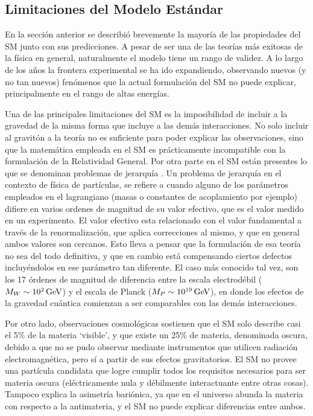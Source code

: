 \subsection{Limitaciones del Modelo Estándar}

En la sección anterior se describió brevemente la mayoría de las propiedades del SM junto con sus predicciones. A pesar de ser una de las teorías más exitosas de la 
física en general,
naturalmente el modelo tiene un rango de validez. A lo largo de los años la frontera experimental se ha ido expandiendo, observando nuevos (y no tan nuevos) fenómenos que la actual formulación del SM no puede explicar, principalmente en el rango de altas energías.

Una de las principales limitaciones del SM es la imposibilidad de incluir a la gravedad de la misma forma que incluye a las demás interacciones. No solo incluir al gravitón a la teoría no es suficiente para poder explicar las observaciones, sino que la matemática empleada en el SM es prácticamente incompatible con la formulación de la Relatividad General. Por otra parte en el SM están presentes lo que se denominan problemas de jerarquía \cite{hierarchy}. 
Un problema de jerarquía en el contexto de física de partículas, se refiere a cuando alguno de los parámetros empleados en el lagrangiano (masas o constantes de acoplamiento por ejemplo) difiere en varios ordenes de magnitud de su valor efectivo, que es el valor medido en un experimento. El valor efectivo esta relacionado con el valor fundamental a través de la renormalización, que aplica correcciones al mismo, y que en general ambos valores son cercanos.
Esto lleva a pensar que la formulación de esa teoría no sea del todo definitiva, y que en cambio está compensando ciertos defectos incluyéndolos en ese parámetro tan diferente. 
El caso más conocido tal vez, son los 17 órdenes de magnitud de diferencia entre la escala electrodébil ($M_W\sim 10^{2}\,\text{GeV}$) y el escala de Planck ($M_P\sim 10^{19}\,\text{GeV}$), en donde los efectos de la gravedad cuántica comienzan a ser comparables con las demás interacciones.

Por otro lado, observaciones cosmológicas sostienen que el SM solo describe casi el 5\% de la materia `visible', y que existe un 25\% de materia, denominada oscura, debido a que no se pudo observar mediante instrumentos que utilicen radiación electromagnética, pero sí a partir de sus efectos gravitatorios. El SM no provee una partícula candidata que logre cumplir todos los requisitos necesarios para ser materia oscura (eléctricamente nula y débilmente interactuante entre otras cosas). Tampoco explica la asimetría bariónica, ya que en el universo abunda la materia con respecto a la antimateria, y el SM no puede explicar diferencias entre ambos.

